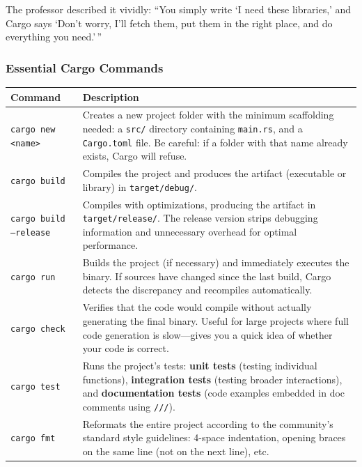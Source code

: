 The professor described it vividly: ``You simply write `I need these libraries,' and Cargo says `Don't worry, I'll fetch them, put them in the right place, and do everything you need.'\,''

\subsubsection{Essential Cargo Commands}

\begin{center}
\begin{tabular}{|l|p{10cm}|}
\hline
\textbf{Command} & \textbf{Description} \\
\hline
\texttt{cargo new <name>} & Creates a new project folder with the minimum scaffolding needed: a \texttt{src/} directory containing \texttt{main.rs}, and a \texttt{Cargo.toml} file. Be careful: if a folder with that name already exists, Cargo will refuse. \\
\hline
\texttt{cargo build} & Compiles the project and produces the artifact (executable or library) in \texttt{target/debug/}. \\
\hline
\texttt{cargo build --release} & Compiles with optimizations, producing the artifact in \texttt{target/release/}. The release version strips debugging information and unnecessary overhead for optimal performance. \\
\hline
\texttt{cargo run} & Builds the project (if necessary) and immediately executes the binary. If sources have changed since the last build, Cargo detects the discrepancy and recompiles automatically. \\
\hline
\texttt{cargo check} & Verifies that the code would compile without actually generating the final binary. Useful for large projects where full code generation is slow---gives you a quick idea of whether your code is correct. \\
\hline
\texttt{cargo test} & Runs the project's tests: \textbf{unit tests} (testing individual functions), \textbf{integration tests} (testing broader interactions), and \textbf{documentation tests} (code examples embedded in doc comments using \texttt{///}). \\
\hline
\texttt{cargo fmt} & Reformats the entire project according to the community's standard style guidelines: 4-space indentation, opening braces on the same line (not on the next line), etc. \\
\hline
\end{tabular}
\end{center}

